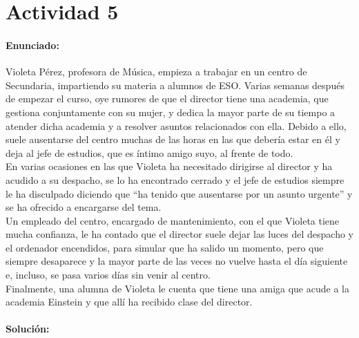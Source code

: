 \newpage
\section*{Actividad 5}

\paragraph{Enunciado: }
Violeta Pérez, profesora de Música, empieza a trabajar en un centro de Secundaria, impartiendo su materia a
alumnos de ESO.
 Varias semanas después de empezar el curso, oye rumores de que el director tiene una
academia, que gestiona conjuntamente con su mujer, y dedica la mayor parte de su tiempo a atender dicha
academia y a resolver asuntos relacionados con ella.
 Debido a ello, suele ausentarse del centro muchas de las
horas en las que debería estar en él y deja al jefe de estudios, que es íntimo amigo suyo, al frente de todo.
\\
En varias ocasiones en las que Violeta ha necesitado dirigirse al director y ha acudido a su despacho, se lo ha
encontrado cerrado y el jefe de estudios siempre le ha disculpado diciendo que “ha tenido que ausentarse por
un asunto urgente” y se ha ofrecido a encargarse del tema.
\\
Un empleado del centro, encargado de mantenimiento, con el que Violeta tiene mucha confianza, le ha
contado que el director suele dejar las luces del despacho y el ordenador encendidos, para simular que ha
salido un momento, pero que siempre desaparece y la mayor parte de las veces no vuelve hasta el día siguiente
e, incluso, se pasa varios días sin venir al centro.
\\
Finalmente, una alumna de Violeta le cuenta que tiene una amiga que acude a la academia Einstein y que allí
ha recibido clase del director.

\paragraph{Solución: }

